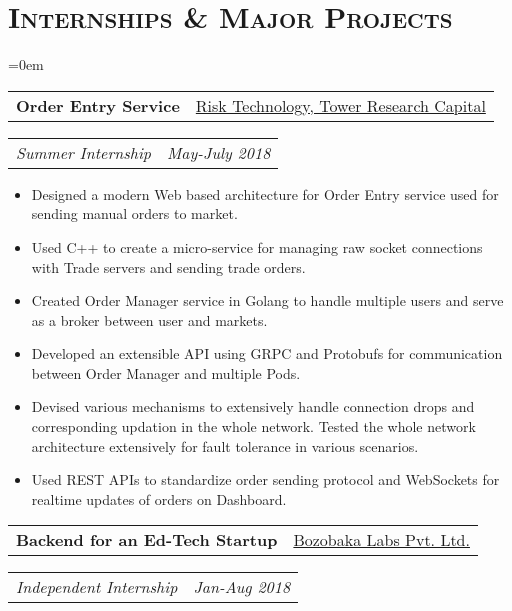 \documentclass{article}
\makeatletter
\newcommand{\headerrow}[2]
{\begin{tabular*}{\linewidth}{l@{\extracolsep{\fill}}r}
	#1 &
	#2 \\
\end{tabular*}}
\newcommand{\tmpsection}[1]{}
\let\tmpsection=\section
\renewcommand{\section}[1]{\tmpsection*{\textsc{#1}}}
\makeatother
\begin{document}
\section{Internships \& Major Projects}
\begin{list} {}{\leftmargin=0em}
\setlength{\leftmargin}{0pt}

    \item[]
    \headerrow {\textbf{Order Entry Service}}{\underline{Risk Technology, Tower Research Capital}}
    \headerrow {\emph{Summer Internship}}{\emph{May-July 2018}}
    \begin{itemize}
    \setlength\itemsep{0.0em}
	\item Designed a modern Web based architecture for Order Entry service used for sending manual orders to market.
	\item Used C++ to create a micro-service for managing raw socket connections with Trade servers and sending trade orders. 
	\item Created Order Manager service in Golang to handle multiple users and serve as a broker between user and markets.
	\item Developed an extensible API using GRPC and Protobufs for communication between Order Manager and multiple Pods.
	\item Devised various mechanisms to extensively handle connection drops and corresponding updation in the whole network. Tested the whole network architecture extensively for fault tolerance in various scenarios.
    \item Used REST APIs to standardize order sending protocol and WebSockets for realtime updates of orders on Dashboard.
    \end{itemize}
    \item[]
    \headerrow {\textbf{Backend for an Ed-Tech Startup}}{\underline{Bozobaka Labs Pvt. Ltd.}}
    \headerrow {\emph{Independent Internship}}{\emph{Jan-Aug 2018}}
    \begin{itemize}

\end{itemize}
\end{list}
\end{document}
